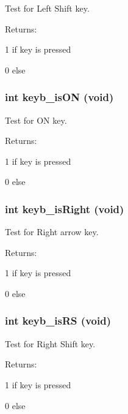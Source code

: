 Test for Left Shift key.

\begin{Desc}
\item[Returns: ]\par
1 if key is pressed \par
 0 else \end{Desc}
\subsubsection{\setlength{\rightskip}{0pt plus 5cm}int keyb\_\-is\-ON (void)}\label{hpkeyb49_8h_a10}


Test for ON key.

\begin{Desc}
\item[Returns: ]\par
1 if key is pressed \par
 0 else \end{Desc}
\subsubsection{\setlength{\rightskip}{0pt plus 5cm}int keyb\_\-is\-Right (void)}\label{hpkeyb49_8h_a4}


Test for Right arrow key.

\begin{Desc}
\item[Returns: ]\par
1 if key is pressed \par
 0 else \end{Desc}
\subsubsection{\setlength{\rightskip}{0pt plus 5cm}int keyb\_\-is\-RS (void)}\label{hpkeyb49_8h_a9}


Test for Right Shift key.

\begin{Desc}
\item[Returns: ]\par
1 if key is pressed \par
 0 else \end{Desc}
